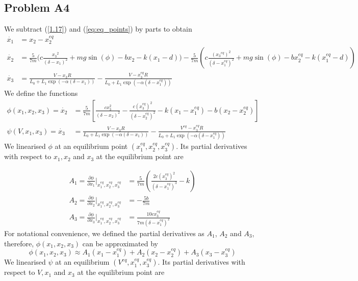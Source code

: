 \documentclass[a4paper,10pt,reqno]{amsart}
\numberwithin{equation}{section}
\begin{document}
\subsection{Problem A4}\label{sec:a4}
We subtract (\ref{1.17}) and (\ref{eq:eq_points}) by parts to obtain
\begin{subequations}
     \begin{align}
          \dot{x_1} &= x_2 - x_2^{eq} \\
          \dot{x_2} &=  \frac{5}{7m}\bigg(c \frac{{x_3}^2}{(\delta - x_1)^2} + mg\sin(\phi) - bx_2 - k(x_1-d)\bigg) - \frac{5}{7m}\left(c \frac{({x_3}^{eq})^2}{(\delta - x_1^{eq})^2} + mg\sin(\phi) - bx_2^{eq} - k(x_1^{eq}-d)\right) \label{eq:x2dot}\\
          \dot{x_3} &= \frac{V - x_3R}{L_0 + L_1\exp(-\alpha(\delta - x_1))} - \frac{V - x_3^{eq}R}{L_0 + L_1\exp(-\alpha(\delta - x_1^{eq}))} \label{eq:x3dot}
     \end{align}
\end{subequations}
We define the functions
\begin{subequations}
    \begin{align}
         \phi(x_1, x_2, x_3) = \dot{x_2} &= \frac{5}{7m}\left[\frac{cx_3^2}{(\delta - x_2)^2} - \frac{c(x_3^{eq})^2}{(\delta - x_2^{eq})^2} - k(x_1 - x_1^{eq}) - b(x_2 - x_2^{eq})\right] \\
         \psi(V, x_1, x_3) = \dot{x_3} &= \frac{V - x_3R}{L_0 + L_1\exp(-\alpha(\delta - x_1))} - \frac{V^{eq} - x_3^{eq}R}{L_0 + L_1\exp(-\alpha(\delta - x_1^{eq}))}
    \end{align}
\end{subequations}
We linearised $\phi$ at an equilibrium point $(x_1^{eq}, x_2^{eq}, x_3^{eq})$. Its partial derivatives with respect to $x_1, x_2$ and $x_3$ at the equilibrium point are

\begin{subequations}\label{eq:phiDeriv}
     \begin{align}
          A_1 = \frac{\partial\phi}{\partial x_1}\Bigg|_{x_1^{eq}, x_2^{eq}, x_3^{eq}} &= \frac{5}{7 m}\left(\frac{2 c (x_3^{eq})^{2}}{\left(\delta - x_{1}^{eq}\right)^{3}} - k\right) \\
          A_2 = \frac{\partial\phi}{\partial x_2}\Bigg|_{x_1^{eq}, x_2^{eq}, x_3^{eq}} &= - \frac{5 b}{7 m} \\
          A_3 = \frac{\partial\phi}{\partial x_3}\Bigg|_{x_1^{eq}, x_2^{eq}, x_3^{eq}} &= \frac{10 c x_{3}^{eq}}{7 m \left(\delta - x_{1}^{eq}\right)^{2}}
     \end{align}
\end{subequations}
For notational convenience, we defined the partial derivatives as $A_1$, $A_2$ and $A_3$, therefore, $\phi(x_1, x_2, x_3)$ can be approximated by
\begin{equation}
     \phi(x_1, x_2, x_3) \approx A_1(x_1 - x_1^{eq}) + A_2(x_2 - x_2^{eq}) + A_3(x_3 - x_3^{eq})
\end{equation}
We linearised $\psi$ at an equilibrium $(V^{eq}, x_1^{eq}, x_3^{eq})$. Its partial derivatives with respect to $V, x_1$ and $x_3$ at the equilibrium point are
\end{document}
